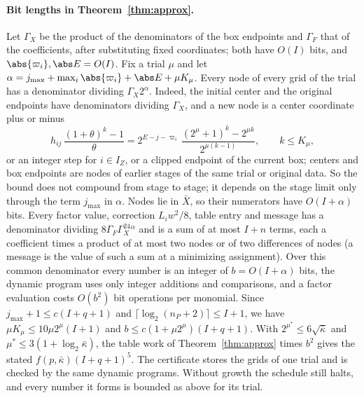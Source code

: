 \paragraph{Bit lengths in Theorem~\ref{thm:approx}.}
Let $\Gamma_X$ be the product of the denominators of the box endpoints and
$\Gamma_F$ that of the coefficients, after substituting fixed coordinates;
both have $O(I)$ bits, and $\abs{\varpi_i},\abs E=O(I)$. Fix a trial $\mu$
and let $\alpha=j_{\max}+\max_i\abs{\varpi_i}+\abs E+\mu K_\mu$. Every node of
every grid of the trial has a denominator dividing $\Gamma_X2^\alpha$. Indeed, the initial
center and the original endpoints have denominators dividing $\Gamma_X$, and a
new node is a center coordinate plus or minus
\[
h_{ij}\,\frac{(1+\theta)^k-1}{\theta}
=2^{E-j-\varpi_i}\,\frac{(2^\mu+1)^k-2^{\mu k}}{2^{\mu(k-1)}},\qquad k\le K_\mu,
\]
or an integer step for $i\in I_Z$, or a clipped endpoint of the current box;
centers and box endpoints are nodes of earlier stages of the same trial or
original data. So the bound does not compound from stage to stage; it
depends on the stage limit only through the term $j_{\max}$ in $\alpha$. Nodes
lie in $\bar X$, so their numerators have $O(I+\alpha)$ bits. Every factor
value, correction $L_iw^2/8$, table entry and message has a denominator
dividing $8\Gamma_F\Gamma_X^24^\alpha$ and is a sum of at most $I+n$ terms,
each a coefficient times a product of at most two nodes or of two
differences of nodes (a message is the value of such a sum at a minimizing
assignment). Over this common denominator every number is an integer of
$b=O(I+\alpha)$ bits, the dynamic program uses only integer additions and
comparisons, and a factor evaluation costs $O(b^2)$ bit operations per
monomial. Since $j_{\max}+1\le c(I+q+1)$ and $\lceil\log_2(n_P+2)\rceil\le I+1$, we
have $\mu K_\mu\le10\mu2^\mu(I+1)$ and $b\le c(1+\mu2^\mu)(I+q+1)$. With
$2^{\mu^*}\le6\sqrt{\bar\kappa}$ and $\mu^*\le3(1+\log_2\bar\kappa)$, the
table work of Theorem~\ref{thm:approx} times $b^2$ gives the stated
$f(p,\bar\kappa)(I+q+1)^5$. The certificate stores the grids of one trial and
is checked by the same dynamic programs. Without growth the schedule still
halts, and every number it forms is bounded as above for its trial.

